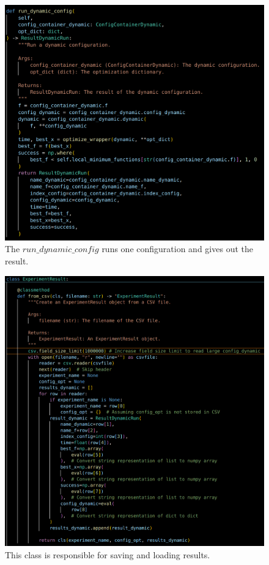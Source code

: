 \documentclass[a4paper, 11pt]{article}
\begin{document}
\begin{figure}[!ht]
\centering
\includegraphics[width=1\textwidth]{imgs/runner3.png}
\caption{The $run\_dynamic\_config$ runs one configuration and gives out the result.} \vspace{-1em}
\label{fig:runner3}
\end{figure}

\begin{figure}[!ht]
\centering
\includegraphics[width=1\textwidth]{imgs/result.png}
\caption{This class is responsible for saving and loading results.} \vspace{-1em}
\label{fig:result}
\end{figure}
\end{document}
